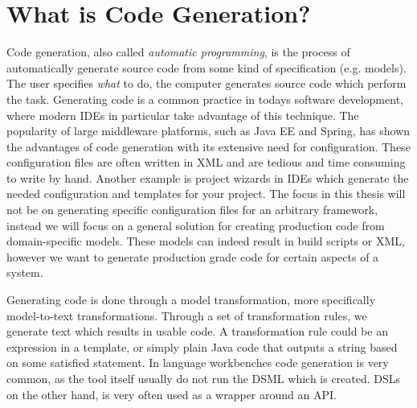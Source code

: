 \section{What is Code Generation?}
Code generation, also called \emph{automatic programming}, is the process of automatically generate source code from some kind of specification (e.g. models). The user specifies \emph{what} to do, the computer generates source code which perform the task. Generating code is a common practice in todays software development, where modern IDEs in particular take advantage of this technique. The popularity of large middleware platforms, such as Java EE and Spring, has shown the advantages of code generation with its extensive need for configuration. These configuration files are often written in XML and are tedious and time consuming to write by hand. Another example is project wizards in IDEs which generate the needed configuration and templates for your project. The focus in this thesis will not be on generating specific configuration files for an arbitrary framework, instead we will focus on a general solution for creating production code from domain-specific models. These models can indeed result in build scripts or XML, however we want to generate production grade code for certain aspects of a system.

Generating code is done through a model transformation, more specifically model-to-text transformations. Through a set of transformation rules, we generate text which results in usable code. A transformation rule could be an expression in a template, or simply plain Java code that outputs a string based on some satisfied statement. In language workbenches code generation is very common, as the tool itself usually do not run the DSML which is created. DSLs on the other hand, is very often used as a wrapper around an API.

